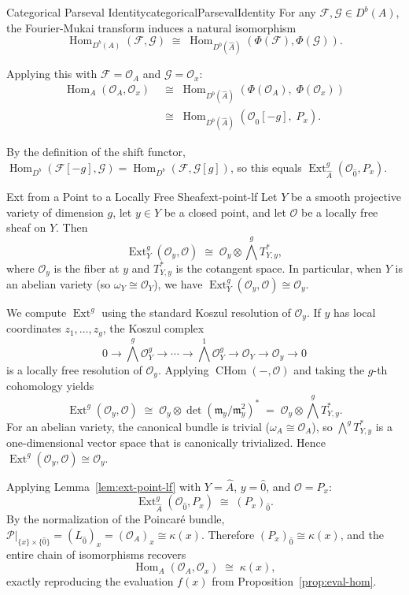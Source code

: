 \documentclass{article}
\newcommand{\CF}{{\mathcal{F}}}
\newcommand{\CG}{{\mathcal{G}}}
\newcommand{\CO}{{\mathcal{O}}}
\newcommand{\CE}{{\mathcal{O}}}
\newcommand{\CP}{{\mathcal{P}}}
\newcommand{\fm}{{\mathfrak{m}}}
\newcommand{\Ext}{{\operatorname{Ext}}}
\newcommand{\Hom}{{\operatorname{Hom}}}
\newcommand{\CHom}{{\operatorname{CHom}}}
\begin{document}
\begin{thm}{Categorical Parseval Identity}{categoricalParsevalIdentity}
For any $\CF, \CG \in D^b(A)$, the Fourier-Mukai transform induces a natural isomorphism
\[
    \Hom_{D^b(A)}(\CF, \CG) \;\cong\; \Hom_{D^b(\hat{A})}(\Phi(\CF), \Phi(\CG)).
\]
\end{thm}

Applying this with $\CF = \CO_A$ and $\CG = \CO_x$:
\begin{align*}
    \Hom_A(\CO_A, \CO_x)
    &\;\cong\; \Hom_{D^b(\hat{A})}(\Phi(\CO_A),\; \Phi(\CO_x)) \\
    &\;\cong\; \Hom_{D^b(\hat{A})}(\CO_{\hat{0}}[-g],\; P_x).
\end{align*}

By the definition of the shift functor, $\Hom_{D^b}(\CF[-g], \CG) = \Hom_{D^b}(\CF, \CG[g])$, so this equals $\Ext^g_{\hat{A}}(\CO_{\hat{0}}, P_x)$.

\begin{lem}{Ext from a Point to a Locally Free Sheaf}{ext-point-lf}
Let $Y$ be a smooth projective variety of dimension $g$, let $y \in Y$ be a closed point, and let $\CE$ be a locally free sheaf on $Y$. Then
\[
    \Ext^g_Y(\CO_y, \CE) \;\cong\; \CE_y \otimes \bigwedge^g T_{Y,y}^*,
\]
where $\CE_y$ is the fiber at $y$ and $T_{Y,y}^*$ is the cotangent space. In particular, when $Y$ is an abelian variety (so $\omega_Y \cong \CO_Y$), we have $\Ext^g_Y(\CO_y, \CE) \cong \CE_y$.
\end{lem}

\begin{Proof}
We compute $\Ext^g$ using the standard Koszul resolution of $\CO_y$. If $y$ has local coordinates $z_1, \ldots, z_g$, the Koszul complex
\[
    0 \to \bigwedge^g \CO_Y^g \to \cdots \to \bigwedge^1 \CO_Y^g \to \CO_Y \to \CO_y \to 0
\]
is a locally free resolution of $\CO_y$. Applying $\CHom(-, \CE)$ and taking the $g$-th cohomology yields
\[
    \Ext^g(\CO_y, \CE) \;\cong\; \CE_y \otimes \det(\fm_y / \fm_y^2)^* \;=\; \CE_y \otimes \bigwedge^g T_{Y,y}^*.
\]
For an abelian variety, the canonical bundle is trivial ($\omega_A \cong \CO_A$), so $\bigwedge^g T^*_{Y,y}$ is a one-dimensional vector space that is canonically trivialized. Hence $\Ext^g(\CO_y, \CE) \cong \CE_y$.
\end{Proof}

Applying Lemma~\ref{lem:ext-point-lf} with $Y = \hat{A}$, $y = \hat{0}$, and $\CE = P_x$:
\[
    \Ext^g_{\hat{A}}(\CO_{\hat{0}}, P_x) \;\cong\; (P_x)_{\hat{0}}.
\]
By the normalization of the Poincar\'{e} bundle, $\CP|_{\{x\} \times \{\hat{0}\}} = (L_{\hat{0}})_x = (\CO_A)_x \cong \kappa(x)$. Therefore $(P_x)_{\hat{0}} \cong \kappa(x)$, and the entire chain of isomorphisms recovers
\[
    \Hom_A(\CO_A, \CO_x) \;\cong\; \kappa(x),
\]
exactly reproducing the evaluation $f(x)$ from Proposition~\ref{prop:eval-hom}.
\end{document}
